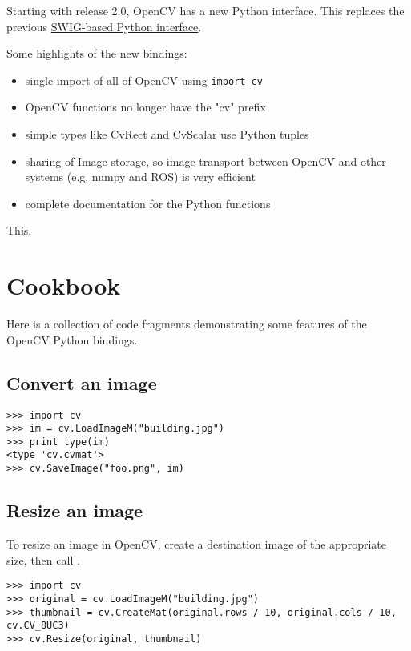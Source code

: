 Starting with release 2.0, OpenCV has a new Python interface. This replaces the previous 
\href{http://opencv.willowgarage.com/wiki/SwigPythonInterface}{SWIG-based Python interface}.

Some highlights of the new bindings:

\begin{itemize}
\item{single import of all of OpenCV using \texttt{import cv}}
\item{OpenCV functions no longer have the "cv" prefix}
\item{simple types like CvRect and CvScalar use Python tuples}
\item{sharing of Image storage, so image transport between OpenCV and other systems (e.g. numpy and ROS) is very efficient}
\item{complete documentation for the Python functions}
\end{itemize}

This.

\section{Cookbook}

Here is a collection of code fragments demonstrating some features
of the OpenCV Python bindings.

\subsection{Convert an image}

\begin{lstlisting}
>>> import cv
>>> im = cv.LoadImageM("building.jpg")
>>> print type(im)
<type 'cv.cvmat'>
>>> cv.SaveImage("foo.png", im)
\end{lstlisting}

\subsection{Resize an image}

To resize an image in OpenCV, create a destination image of the appropriate size, then call .

\begin{lstlisting}
>>> import cv
>>> original = cv.LoadImageM("building.jpg")
>>> thumbnail = cv.CreateMat(original.rows / 10, original.cols / 10, cv.CV_8UC3)
>>> cv.Resize(original, thumbnail)
\end{lstlisting}

